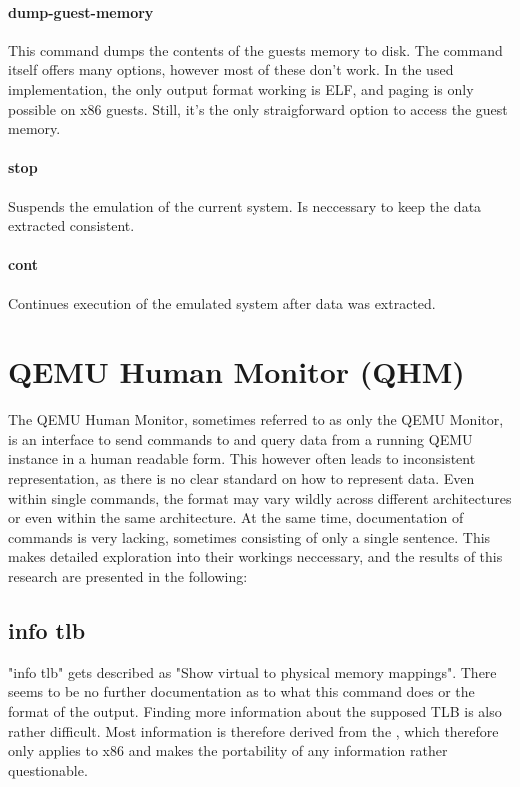 \paragraph{dump-guest-memory}
This command dumps the contents of the guests memory to disk.
The command itself offers many options, however most of these don't work.
In the used implementation, the only output format working is ELF, and paging is only possible on x86 guests.
Still, it's the only straigforward option to access the guest memory.

\paragraph{stop}
Suspends the emulation of the current system. Is neccessary to keep the data extracted consistent.

\paragraph{cont}
Continues execution of the emulated system after data was extracted.

\section{QEMU Human Monitor (QHM)} \label{sec:QHM}
The QEMU Human Monitor, sometimes referred to as only the QEMU Monitor,
is an interface to send commands to and query data from a running QEMU instance in a human readable form.
This however often leads to inconsistent representation, as there is no clear standard on how to represent data.
Even within single commands, the format may vary wildly across different architectures or even within the same architecture.
At the same time, documentation of commands is very lacking, sometimes consisting of only a single sentence.
This makes detailed exploration into their workings neccessary, and the results of this research are presented in the following\cite{qhm-documentation}:

\subsection{info tlb}
"info tlb" gets described as "Show virtual to physical memory mappings"\cite{qhm-documentation}.
There seems to be no further documentation as to what this command does or the format of the output.
Finding more information about the supposed TLB is also rather difficult.
Most information is therefore derived from the ,
which therefore only applies to x86 and makes the portability of any information rather questionable.

